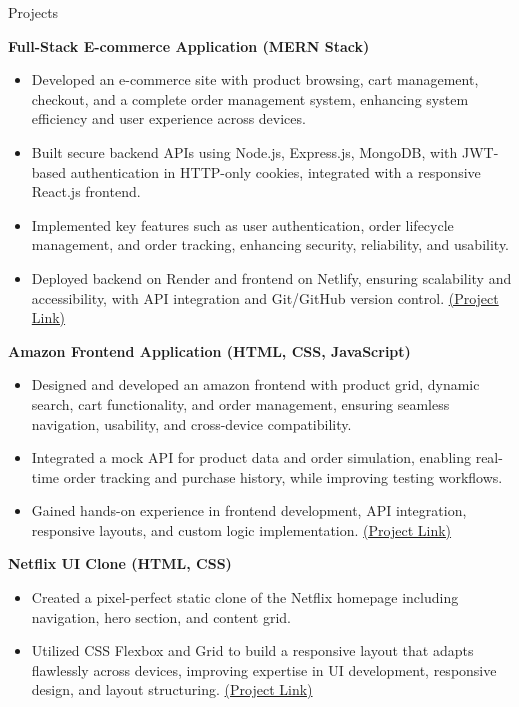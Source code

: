 \documentclass{resume} %
\begin{document}
\begin{rSection}{Projects}

\textbf{Full-Stack E-commerce Application (MERN Stack)}
\begin{itemize}
    \itemsep -7pt
    \item Developed an e-commerce site with product browsing, cart management, checkout, and a complete order management system, enhancing system efficiency and user experience across devices.
    \item Built secure backend APIs using Node.js, Express.js, MongoDB, with JWT-based authentication in HTTP-only cookies, integrated with a responsive React.js frontend.
    \item Implemented key features such as user authentication, order lifecycle management, and order tracking, enhancing security, reliability, and usability.
    \item Deployed backend on Render and frontend on Netlify, ensuring scalability and accessibility, with API integration and Git/GitHub version control.
     \href{https://github.com/SmartSankarCode/ecommerce.git}{(Project Link)}
\end{itemize}

\textbf{Amazon Frontend Application (HTML, CSS, JavaScript)}
\begin{itemize}
    \itemsep -7pt
    \item Designed and developed an amazon frontend with product grid, dynamic search, cart functionality, and order management, ensuring seamless navigation, usability, and cross-device compatibility.
    \item Integrated a mock API for product data and order simulation, enabling real-time order tracking and purchase history, while improving testing workflows.
    \item Gained hands-on experience in frontend development, API integration, responsive layouts, and custom logic implementation.
     \href{https://github.com/SmartSankarCode/Interactive-Amazon-Project.git}{(Project Link)}
\end{itemize}

\textbf{Netflix UI Clone (HTML, CSS)}
\begin{itemize}
    \itemsep -7pt
    \item Created a pixel-perfect static clone of the Netflix homepage including navigation, hero section, and content grid.
    \item Utilized CSS Flexbox and Grid to build a responsive layout that adapts flawlessly across devices, improving expertise in UI development, responsive design, and layout structuring.
     \href{https://github.com/SmartSankarCode/flixNet-OTT-UI-2025.git}{(Project Link)}
\end{itemize}

\end{rSection}
\end{document}
